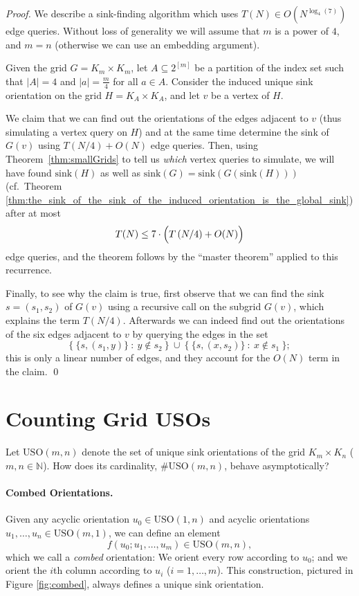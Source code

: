 \documentclass[runningheads,a4paper]{llncs}
\newcommand{\USO}{\ensuremath{\mathrm{USO}}}
\newcommand{\sink}{\ensuremath{\mathrm{sink}}}
\begin{document}
\begin{proof}
    We describe a sink-finding algorithm which uses
    $T(N) \in O(N ^ {\log_4(7)})$ edge queries.
    Without loss of generality we will assume that $m$ is a power of $4$, and
    $m=n$ (otherwise we can use an embedding argument).

    Given the grid $G = K_m \times K_m$, let $A \subseteq 2 ^ {[m]}$
    be a partition of the index set such that
    $|A| = 4$ and $|a| = \frac{m}{4}$ for all $a \in A$.
    Consider the induced unique sink orientation on the grid
    $H = K_{A} \times K_{A}$, and let $v$ be a vertex of $H$.

    We claim that we can find out the orientations of the edges adjacent to
    $v$ (thus simulating a vertex query on $H$)
    and at the same time determine the sink of $G(v)$ using
    $T( N/4 ) + O(N)$
    edge queries.
    Then, using Theorem~\ref{thm:smallGrids} to tell us \emph{which} vertex
    queries to simulate, we will have found $\sink(H)$ as well as
    $\sink(G) = \sink(G(\sink(H)))$ (cf.~Theorem
    \ref{thm:the_sink_of_the_sink_of_the_induced_orientation_is_the_global_sink})
    after at most
    \[
        T(N) \le 7 \cdot \Bigl( T \left( N/4 \right) + O(N) \Bigr)
    \]
    edge queries, and the theorem follows by the ``master theorem'' applied to
    this recurrence.

    Finally, to see why the claim is true, first observe that we can find the
    sink $s = (s_1,s_2)$ of $G(v)$ using a recursive call on the subgrid
    $G(v)$, which explains the term $T(N/4)$.
    Afterwards we can indeed find out the orientations of the six edges
    adjacent to $v$ by querying the edges in the set
    \[
        \bigl\{~ \{ s,(s_1,y) \} ~:~ y \notin s_2 ~\bigr\}
        ~\cup~
        \bigl\{~ \{ s,(x,s_2) \} ~:~ x \notin s_1 ~\bigr\};
    \]
    this is only a linear number of edges, and they account for the $O(N)$
    term in the claim.
    \qed
\end{proof}

\section{Counting Grid USOs}
\label{section:counting_unique_sink_orientations}


Let $\USO(m,n)$ denote the set of unique sink orientations of the grid
$K_m \times K_n$ ($m,n \in \mathbb{N}$).
How does its cardinality, $\#\USO(m,n)$, behave asymptotically?

\paragraph{Combed Orientations.}
Given any acyclic orientation $u_0 \in \USO(1,n)$ and acyclic orientations
$u_1,\dots,u_n \in \USO(m,1)$, we can define an element
\[ f(u_0;u_1,\dots,u_m) \in \USO(m,n), \]
which we call a \emph{combed} orientation:
We orient every row according to $u_0$; and we orient the $i$th column
according to $u_i$ ($i = 1,\dots,m$).
This construction, pictured in Figure \ref{fig:combed}, always defines a
unique sink orientation.
\end{document}
